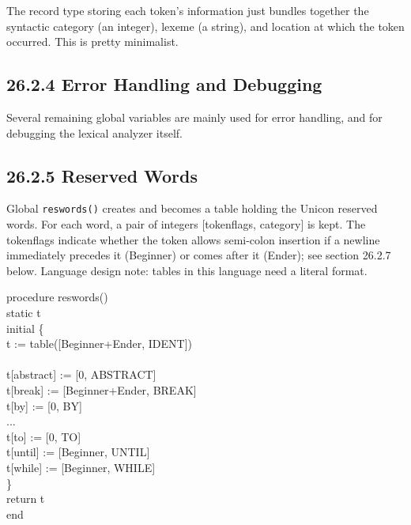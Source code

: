 The record type storing each token's information just bundles together
the syntactic category (an integer), lexeme (a string), and location
at which the token occurred. This is pretty minimalist.


\subsection[26.2.4 Error Handling and Debugging]{26.2.4 Error Handling and Debugging}

Several remaining global variables are mainly used for error handling,
and for debugging the lexical analyzer itself.

\subsection[26.2.5 Reserved Words]{26.2.5 Reserved Words}

Global \texttt{reswords()} creates and becomes a table holding the
Unicon reserved words. For each word, a pair of integers [tokenflags,
category] is kept.  The tokenflags indicate whether the token allows
semi-colon insertion if a newline immediately precedes it (Beginner)
or comes after it (Ender); see section 26.2.7 below. Language design
note: tables in this language need a literal format.

\begin{iconcode}
procedure reswords() \\
static t \\
initial \{ \\
\>   t := table([Beginner+Ender, IDENT]) \\
\ \\
\>   t[{\textquotedbl}abstract{\textquotedbl}] := [0, ABSTRACT] \\
\>   t[{\textquotedbl}break{\textquotedbl}] := [Beginner+Ender, BREAK] \\
\>   t[{\textquotedbl}by{\textquotedbl}] := [0, BY] \\

\>   ... \\

\>   t[{\textquotedbl}to{\textquotedbl}] := [0, TO] \\
\>   t[{\textquotedbl}until{\textquotedbl}] := [Beginner, UNTIL] \\
\>   t[{\textquotedbl}while{\textquotedbl}] := [Beginner, WHILE] \\
\>   \} \\

return t \\
end
\end{iconcode}

